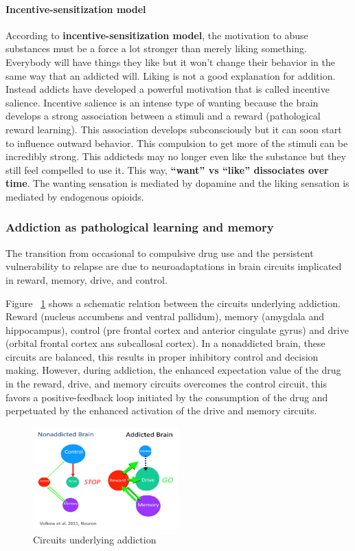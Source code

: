 \documentclass[12pt,article,oneside,a4paper]{memoir}
\begin{document}
\paragraph{Incentive-sensitization model}
According to \textbf{incentive-sensitization model}, the motivation to abuse substances must be a force a lot stronger than merely liking something. Everybody will have things they like but it won’t change their behavior in the same way that an addicted will. Liking is not a good explanation for addition. Instead addicts have developed a powerful motivation that is called incentive salience.
Incentive salience is an intense type of wanting because the brain develops a strong association between a stimuli and a reward (pathological reward learning). This association develops subconsciously but it can soon start to influence outward behavior. This compulsion to get more of the stimuli can be incredibly strong. This addicteds may no longer even like the substance but they still feel compelled to use it.
This way, \textbf{``want'' vs ``like'' dissociates over time}. The wanting sensation is mediated by dopamine and the liking sensation is mediated by endogenous opioids.


\subsubsection{Addiction as pathological learning and memory}
The transition from occasional to compulsive drug use and the persistent vulnerability to relapse are due to neuroadaptations in brain circuits implicated in reward, memory, drive, and control.

Figure ~\ref{fig:circuits-drug-addiction} shows a schematic relation between the circuits underlying addiction. Reward (nucleus accumbens and ventral pallidum), memory (amygdala and hippocampus), control (pre frontal cortex and anterior cingulate gyrus) and drive (orbital frontal cortex ans subcallosal cortex). In a nonaddicted brain, these circuits are balanced, this results in proper inhibitory control and decision making. However, during addiction, the enhanced expectation value of the drug in the reward, drive, and memory circuits overcomes the control circuit, this favors a positive-feedback loop initiated by the consumption of the drug and perpetuated by the enhanced activation of the drive and memory circuits. 

\begin{figure}
  \centering
  \includegraphics[width=0.5\textwidth]{imgs/circuits-drug-addiction.png}
  \caption{Circuits underlying addiction}
  \label{fig:circuits-drug-addiction}
\end{figure}
\end{document}
